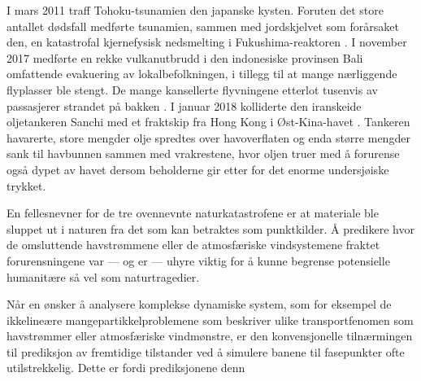 I mars 2011 traff Tohoku-tsunamien den japanske kysten. Foruten det store
antallet dødsfall medførte tsunamien, sammen med jordskjelvet som forårsaket
den, en katastrofal kjernefysisk nedsmelting i Fukushima-reaktoren
\parencite{atomic2015fukushima}. I
november 2017 medførte en rekke vulkanutbrudd i den indonesiske provinsen
Bali omfattende evakuering av lokalbefolkningen, i tillegg til at mange
nærliggende flyplasser ble stengt. De mange kansellerte flyvningene etterlot
tusenvis av passasjerer strandet på bakken \parencite{kapoor2017bali}. I januar
2018 kolliderte den iranskeide oljetankeren Sanchi med et fraktskip fra Hong
Kong i Øst-Kina-havet \parencite{obayashi2018stricken}.
Tankeren havarerte, store mengder olje spredtes over havoverflaten og enda
større mengder sank til havbunnen sammen med vrakrestene, hvor oljen truer
med å forurense også dypet av havet dersom beholderne gir etter for det
enorme undersjøiske trykket.

En fellesnevner for de tre ovennevnte naturkatastrofene er at materiale
ble sluppet ut i naturen fra det som kan betraktes som punktkilder. Å predikere
hvor de omsluttende havstrømmene eller de atmosfæriske vindsystemene fraktet
forurensningene var --- og er --- uhyre viktig for å kunne begrense potensielle
humanitære så vel som naturtragedier.

Når en ønsker å analysere komplekse dynamiske system, som for eksempel de
ikkelineære mangepartikkelproblemene som beskriver ulike transportfenomen
som havstrømmer eller atmosfæriske vindmønstre, er den konvensjonelle
tilnærmingen til prediksjon av fremtidige tilstander ved å simulere
banene til fasepunkter ofte utilstrekkelig. Dette er fordi prediksjonene
denn

